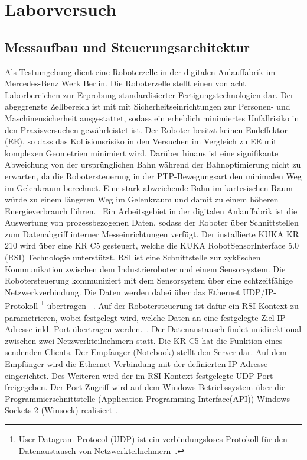 \chapter{Laborversuch}
%
\section{Messaufbau und Steuerungsarchitektur}
Als Testumgebung dient eine Roboterzelle in der digitalen Anlauffabrik im Mercedes-Benz Werk Berlin.
Die Roboterzelle stellt einen von acht Laborbereichen zur Erprobung standardisierter Fertigungstechnologien dar.  Der abgegrenzte Zellbereich ist mit mit Sicherheitseinrichtungen zur Personen- und Maschinensicherheit ausgestattet, sodass ein erheblich minimiertes Unfallrisiko in den Praxisversuchen gewährleistet ist. Der Roboter besitzt keinen Endeffektor (EE), so dass das Kollisionsrisiko in den Versuchen im Vergleich zu EE mit komplexen Geometrien minimiert wird. Darüber hinaus ist eine signifikante Abweichung von der ursprünglichen Bahn während der Bahnoptimierung nicht zu erwarten, da die Robotersteuerung in der PTP-Bewegungsart den minimalen Weg im Gelenkraum berechnet. Eine stark abweichende Bahn im kartesischen Raum würde zu einem längeren Weg im Gelenkraum und damit zu einem höheren Energieverbrauch führen.~\cite[S.~59]{Eggers.2019}
%
Ein Arbeitsgebiet in der digitalen Anlauffabrik ist die Auswertung von prozessbezogenen Daten, sodass der Roboter über Schnittstellen zum Datenabgriff interner Messeinrichtungen verfügt. Der installierte KUKA KR 210 wird über eine KR C5 gesteuert, welche die KUKA RobotSensorInterface 5.0 (RSI) Technologie unterstützt. RSI ist eine Schnittstelle zur zyklischen Kommunikation zwischen dem Industrieroboter und einem Sensorsystem. Die Robotersteuerung kommuniziert mit dem Sensorsystem über eine echtzeitfähige Netzwerkverbindung. Die Daten werden dabei über das Ethernet UDP/IP-Protokoll \footnote{User Datagram Protocol (UDP) ist ein verbindungsloses Protokoll für den Datenaustausch von Netzwerkteilnehmern~\cite{RSI.2020}.} übertragen ~\cite[S.~11]{RSI.2020}. 
Auf der Robotersteuerung ist daf{\"u}r ein RSI-Kontext zu parametrieren, wobei festgelegt wird, welche Daten an eine festgelegte Ziel-IP-Adresse inkl. Port {\"u}bertragen werden.~\cite[S.~43]{RSI.2020}.  Der Datenaustausch findet unidirektional zwischen zwei Netzwerkteilnehmern statt. Die KR C5 hat die Funktion eines sendenden Clients. Der Empfänger (Notebook) stellt den Server dar. Auf dem Empfänger wird die Ethernet Verbindung mit der definierten IP Adresse eingerichtet. Des Weiteren wird der im RSI Kontext festgelegte UDP-Port freigegeben. Der Port-Zugriff wird auf dem Windows Betriebssystem über die Programmierschnittstelle (Application Programming Interface(API)) Windows Sockets 2 (Winsock) realisiert \cite{Winsock.2023}. 
